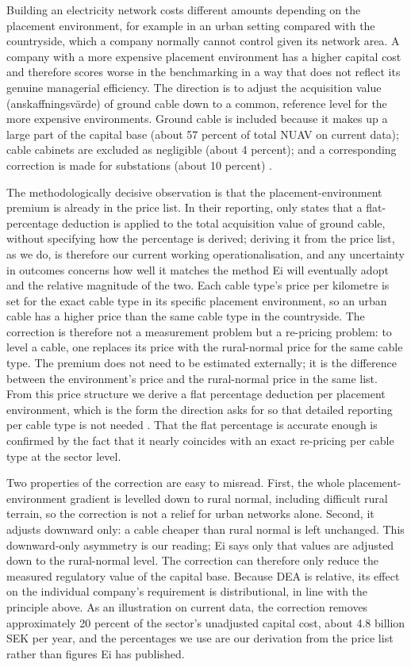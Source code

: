 Building an electricity network costs different amounts depending on the placement environment, for
example in an urban setting compared with the countryside, which a company normally cannot control
given its network area. A company with a more expensive placement environment has a higher capital
cost and therefore scores worse in the benchmarking in a way that does not reflect its genuine managerial efficiency.
The direction is to adjust the acquisition value (anskaffningsvärde) of ground cable down to a common, reference level for the more expensive environments. Ground cable is included because it makes up a large
part of the capital base (about 57 percent of total NUAV on current data); cable cabinets are excluded as negligible (about 4 percent); and a
corresponding correction is made for substations (about 10 percent) \citep[][]{Ei2025Benchmarking}.

The methodologically decisive observation is that the placement-environment premium is already in
the price list. In their reporting, \citep[][]{Ei2025Benchmarking} only states that a flat-percentage deduction is applied to the total
acquisition value of ground cable, without specifying how the percentage is derived; deriving it
from the price list, as we do, is therefore our current working operationalisation, and any uncertainty in outcomes concerns how well it matches the method Ei will
eventually adopt and the relative magnitude of the two. Each cable type's price per kilometre is
set for the exact cable type in its specific placement environment, so an urban cable has a higher
price than the same cable type in the countryside. The correction is therefore not a measurement problem but a re-pricing problem: to
level a cable, one replaces its price with the rural-normal price for the same cable type. The
premium does not need to be estimated externally; it is the difference between the environment's
price and the rural-normal price in the same list. From this price structure we derive a flat
percentage deduction per placement environment, which is the form the direction asks for so that
detailed reporting per cable type is not needed \citep[][]{Ei2025Benchmarking}. That the flat
percentage is accurate enough is confirmed by the fact that it nearly coincides with an exact
re-pricing per cable type at the sector level.

Two properties of the correction are easy to misread. First, the whole placement-environment
gradient is levelled down to rural normal, including difficult rural terrain, so the correction is
not a relief for urban networks alone. Second, it adjusts downward only: a cable cheaper than rural
normal is left unchanged. This downward-only asymmetry is our reading; Ei says only that values are
adjusted down to the rural-normal level. The correction can therefore only reduce the measured
regulatory value of the capital base.
Because DEA is relative, its effect on the individual company's requirement is distributional, in
line with the principle above. As an illustration on current data, the correction removes
approximately 20 percent of the sector's unadjusted capital cost, about 4.8 billion SEK per year,
and the percentages we use are our derivation from the price list rather than figures Ei has
published.

